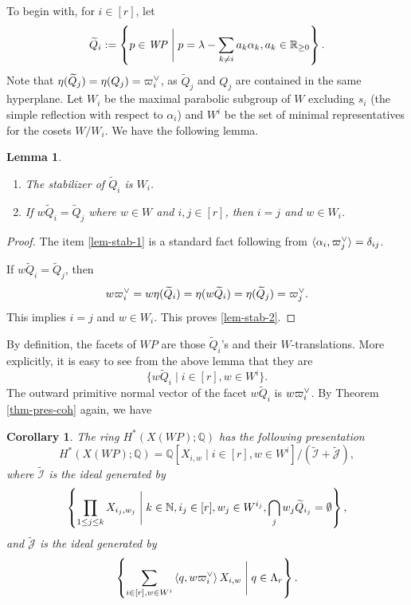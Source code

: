 \documentclass{amsart}
\newtheorem{lemma}[theorem]{Lemma}
\newtheorem{corollary}[theorem]{Corollary}
\theoremstyle{definition}
\theoremstyle{remark}
\numberwithin{equation}{section}
\begin{document}
To begin with, for $i \in [r]$, let 
\[\widetilde{Q}_i : = \left\{p \in \mathit{WP} \Biggm\vert p = \lambda - \sum_{k \ne i} a_k \alpha_k, a_k \in \mathbb{R}_{\ge 0} \right\}.\]
Note that $\eta(\widetilde{Q}_j) = \eta(Q_j)=\varpi_i\spcheck$, as $\widetilde{Q}_j$ and $Q_j$ are contained in the same hyperplane.
Let $W_i$ be the maximal parabolic subgroup of $W$ excluding $s_i$ (the simple  reflection with respect to $\alpha_i$) and $W^i$ be the set of minimal representatives for the cosets $W / W_i$. We have the following lemma.

\begin{lemma} \label{lem-stab}
  \leavevmode
  \begin{enumerate}
      \item \label{lem-stab-1} The stabilizer of $\widetilde{Q}_i$ is $W_i$.
      \item \label{lem-stab-2} If $w \widetilde{Q}_i = \widetilde{Q}_j$ where $w \in W$ and $i,j \in [r]$, then $i = j$ and $w \in W_i$.
  \end{enumerate}
\end{lemma}

\begin{proof}
    The item \eqref{lem-stab-1} is a standard fact following from $\langle \alpha_i, \varpi_j\spcheck \rangle= \delta_{ij}$.

    If $w \widetilde{Q}_i = \widetilde{Q}_j$, then 
    \[w \varpi_i \spcheck = w \eta(\widetilde{Q}_i) = \eta(w \widetilde{Q}_i) = \eta(\widetilde{Q}_j) = \varpi_j\spcheck.\]
    This implies $i = j$ and $w \in W_i$.
    This proves \eqref{lem-stab-2}.
\end{proof}

By definition, the facets of $\mathit{WP}$ are those $\widetilde{Q}_i$'s and their $W$-translations.
More explicitly, it is easy to see from the above lemma that they are 
\[\{w \widetilde{Q}_i \mid i \in [r], w \in W^i\}.\]
The outward primitive normal vector of the facet $w \widetilde{Q}_i$ is $w \varpi_i\spcheck$.
By Theorem \ref{thm-pres-coh} again, we have

\begin{corollary}
    The ring $H^*\left(X(\mathit{WP}) ; \mathbb{Q}\right)$ has the following presentation
    \begin{equation} \label{eq-pres-WP}
      H^*\left(X(\mathit{WP}) ; \mathbb{Q}\right)=\mathbb{Q}\left[X_{i,w} \mid i \in [r], w \in W^i\right] / (\widetilde{\mathcal{I}}+ \widetilde{\mathcal{J}}),
    \end{equation}
    where $\widetilde{\mathcal{I}}$ is the ideal generated by
    \[\left\{ \prod_{1 \le j \le k} X_{i_j, w_j} \Biggm| k \in \mathbb{N}, i_j \in [r], w_j \in W^{i_j}, \bigcap_{j} w_{j} \widetilde{Q}_{i_j} = \emptyset \right\},\]
    and $\widetilde{\mathcal{J}}$ is the ideal generated by
    \[\left\{  \sum_{i \in [r], w \in W^i} \left\langle q, w \varpi_i\spcheck \right\rangle X_{i,w} \Biggm| q \in \Lambda_r \right\}.\]
\end{corollary}
\end{document}
